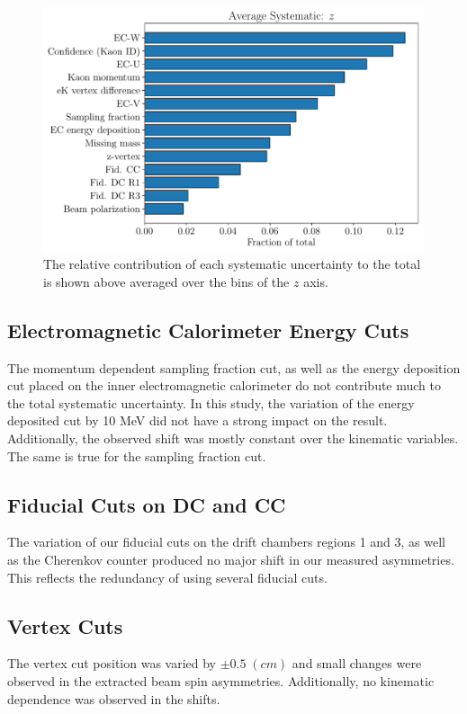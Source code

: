 \begin{figure}
	\centering
	\includegraphics[width=16cm]{image/plots/kaon-bsa/bar-systematics-z.pdf}
	\caption{The relative contribution of each systematic uncertainty to the total is shown above averaged over the bins of the $z$ axis.}
\end{figure}

\subsection{Electromagnetic Calorimeter Energy Cuts}
The momentum dependent sampling fraction cut, as well as the energy deposition cut placed on the inner electromagnetic calorimeter do not contribute much to the total systematic uncertainty.  In this study, the variation of the energy deposited cut by 10 MeV did not have a strong impact on the result.  Additionally, the observed shift was mostly constant over the kinematic variables.  The same is true for the sampling fraction cut.

\subsection{Fiducial Cuts on DC and CC}
The variation of our fiducial cuts on the drift chambers regions 1 and 3, as well as the Cherenkov counter produced no major shift in our measured asymmetries.  This reflects the redundancy of using several fiducial cuts.

\subsection{Vertex Cuts}
The vertex cut position was varied by $\pm 0.5 \; (cm)$ and small changes were observed in the extracted beam spin asymmetries.  Additionally, no kinematic dependence was observed in the shifts.

